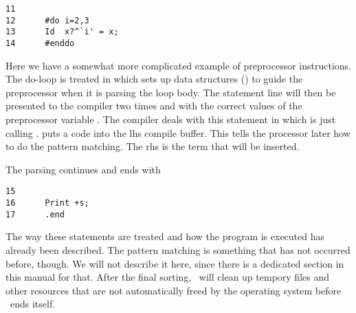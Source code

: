 \begin{verbatim}
11      
12      #do i=2,3
13      Id	x?^`i' = x;
14      #enddo
\end{verbatim}

Here we have a somewhat more complicated example of preprocessor instructions.
The do-loop is treated in  which sets up data structures ()
to guide the preprocessor when it is parsing the loop body. The statement line
will then be presented to the compiler two times and with the correct values of
the preprocessor variable . The compiler deals with this statement in
 which is just calling .  
puts a  code into the lhs compile buffer. This tells the processor
later how to do the pattern matching. The rhs is the term  that will be
inserted.

The parsing continues and ends with

\begin{verbatim}
15      
16      Print +s;
17      .end
\end{verbatim}

The way these statements are treated and how the program is executed has already
been described. The pattern matching is something that has not occurred before,
though. We will not describe it here, since there is a dedicated section in this
manual for that. After the final sorting, \FORM\ will clean up tempory files and
other resources that are not automatically freed by the operating system before
\FORM\ ends itself.
